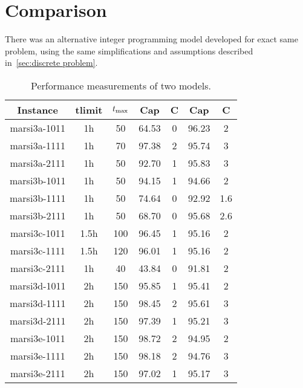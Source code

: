 \section{Comparison}
There was an alternative integer programming model developed for exact same
problem, using the same simplifications and assumptions described
in~\autoref{sec:discrete problem}.

\begin{table}[h]
    \begin{center}
        \begin{tabular}{|c|c|c|c|c|c|c|}
            \hline
            Instance & tlimit & $t_{\max}$ & Cap & C & Cap & C\\
            \hline
            marsi3a-1011 & 1h & 50 & 64.53 & 0 & 96.23 & 2\\
            marsi3a-1111 & 1h & 70 & 97.38 & 2 & 95.74 & 3\\
            marsi3a-2111 & 1h & 50 & 92.70 & 1 & 95.83 & 3\\
            marsi3b-1011 & 1h & 50 & 94.15 & 1 & 94.66 & 2\\
            marsi3b-1111 & 1h & 50 & 74.64 & 0 & 92.92 & 1.6\\
            marsi3b-2111 & 1h & 50 & 68.70 & 0 & 95.68 & 2.6\\
            marsi3c-1011 & 1.5h & 100 & 96.45 & 1 & 95.16 & 2\\
            marsi3c-1111 & 1.5h & 120 & 96.01 & 1 & 95.16 & 2\\
            marsi3c-2111 & 1h & 40 & 43.84 & 0 & 91.81 & 2\\
            marsi3d-1011 & 2h & 150 & 95.85 & 1 & 95.41 & 2\\
            marsi3d-1111 & 2h & 150 & 98.45 & 2 & 95.61 & 3\\
            marsi3d-2111 & 2h & 150 & 97.39 & 1 & 95.21 & 3\\
            marsi3e-1011 & 2h & 150 & 98.72 & 2 & 94.95 & 2\\
            marsi3e-1111 & 2h & 150 & 98.18 & 2 & 94.76 & 3\\
            marsi3e-2111 & 2h & 150 & 97.02 & 1 & 95.17 & 3\\
            \hline
        \end{tabular}
        \caption{Performance measurements of two models.}
        \label{tbl:compare}
    \end{center}
\end{table}
